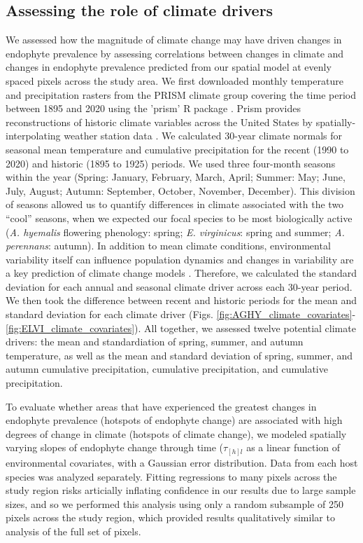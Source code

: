 \documentclass[11pt]{article}
\let\cite\citep
\begin{document}
\subsection*{Assessing the role of climate drivers}
We assessed how the magnitude of climate change may have driven changes in endophyte prevalence by assessing correlations between changes in climate and changes in endophyte prevalence predicted from our spatial model at evenly spaced pixels across the study area.
We first downloaded monthly temperature and precipitation rasters from the PRISM climate group \citep{daly2013prism} covering the time period between 1895 and 2020 using the 'prism' R package \citep{Rprism2015}. 
Prism provides reconstructions of historic climate variables across the United States by spatially-interpolating weather station data \citep{diLuzio2008constructing}. 
We calculated 30-year climate normals for seasonal mean temperature and cumulative precipitation for the recent (1990 to 2020) and historic (1895 to 1925) periods.
We used three four-month seasons within the year (Spring: January, February, March, April; Summer: May; June, July, August; Autumn: September, October, November, December). 
This division of seasons allowed us to quantify differences in climate associated with the two ``cool'' seasons, when we expected our focal species to be most biologically active (\emph{A. hyemalis} flowering phenology: spring; \emph{E. virginicus}: spring and summer; \emph{A. perennans}: autumn). 
In addition to mean climate conditions, environmental variability itself can influence population dynamics \cite{tuljapurkar_population_1982} and changes in variability are a key prediction of climate change models \cite{stocker2013technical, ipcc_2021}.
Therefore, we calculated the standard deviation for each annual and seasonal climate driver across each 30-year period.
We then took the difference between recent and historic periods for the mean and standard deviation for each climate driver (Figs. \ref{fig:AGHY_climate_covariates}-\ref{fig:ELVI_climate_covariates}).
All together, we assessed twelve potential climate drivers: the mean and standardiation of spring, summer, and autumn temperature, as well as the mean and standard deviation of spring, summer, and autumn cumulative precipitation, cumulative precipitation, and cumulative precipitation.

To evaluate whether areas that have experienced the greatest changes in endophyte prevalence (hotspots of endophyte change) are associated with high degrees of change in climate (hotspots of climate change), we modeled spatially varying slopes of endophyte change through time ($\tau_{[h]l}$ as a linear function of environmental covariates, with a Gaussian error distribution.
Data from each host species was analyzed separately. 
Fitting regressions to many pixels across the study region risks articially inflating confidence in our results due to large sample sizes, and so we performed this analysis using only a random subsample of 250 pixels across the study region, which provided results qualitatively similar to analysis of the full set of pixels.
\end{document}
